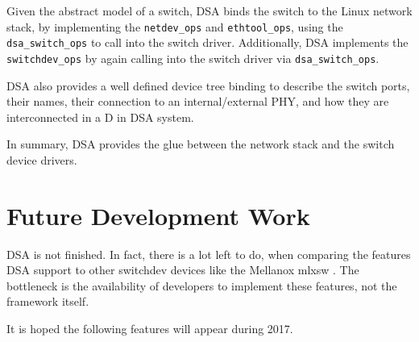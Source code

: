 \documentclass[letterpaper]{article}
\begin{document}
Given the abstract model of a switch, DSA binds the switch to the
Linux network stack, by implementing the \verb|netdev_ops| and
\verb|ethtool_ops|, using the \verb|dsa_switch_ops| to call into the
switch driver. Additionally, DSA implements the \verb|switchdev_ops|
by again calling into the switch driver via \verb|dsa_switch_ops|.

DSA also provides a well defined device tree binding to describe the
switch ports, their names, their connection to an internal/external
PHY, and how they are interconnected in a D in DSA system.

In summary, DSA provides the glue between the network stack and the
switch device drivers.

\section{Future Development Work}

DSA is not finished. In fact, there is a lot left to do, when
comparing the features DSA support to other switchdev devices like the
Mellanox mlxsw \cite{mlxsw}. The bottleneck is the availability of developers
to implement these features, not the framework itself.

It is hoped the following features will appear during 2017.
\end{document}
